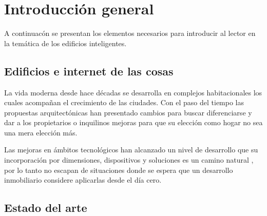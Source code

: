
\chapter{Introducción general} %

\label{Chapter1} %
\label{IntroGeneral}


\newcommand{\keyword}[1]{\textbf{#1}}
\newcommand{\tabhead}[1]{\textbf{#1}}
\newcommand{\code}[1]{\texttt{#1}}
\newcommand{\file}[1]{\texttt{\bfseries#1}}
\newcommand{\option}[1]{\texttt{\itshape#1}}
\newcommand{\grados}{$^{\circ}$}

A continuacón se presentan los elementos necesarios para introducir al lector en la temática de los edificios inteligentes.



\section{Edificios e internet de las cosas}

La vida moderna desde hace décadas se desarrolla en complejos habitacionales los cuales acompañan el crecimiento de las ciudades. Con el paso del tiempo las propuestas arquitectónicas han presentado cambios para buscar diferenciarse y dar a los propietarios o inquilinos mejoras para que su elección como hogar no sea una mera elección más.

Las mejoras en ámbitos tecnológicos han alcanzado un nivel de desarrollo que su incorporación por dimensiones, dispositivos y soluciones es un camino natural , por lo tanto no escapan de situaciones donde se espera que un desarrollo inmobiliario considere aplicarlas desde el día cero. 



\section{Estado del arte}


